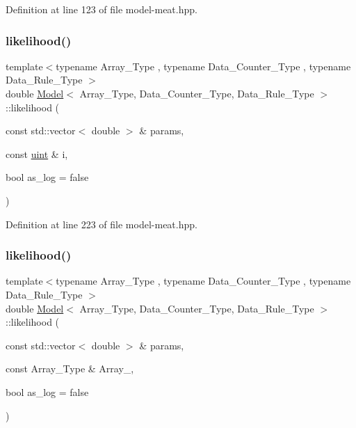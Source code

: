 Definition at line 123 of file model-\/meat.\+hpp.

\mbox{\label{class_model_ae75fe2213980b6b245e279c7836ab99b}} 
\subsubsection{\texorpdfstring{likelihood()}{likelihood()}\hspace{0.1cm}{\footnotesize\ttfamily [1/2]}}
{\footnotesize\ttfamily template$<$typename Array\+\_\+\+Type , typename Data\+\_\+\+Counter\+\_\+\+Type , typename Data\+\_\+\+Rule\+\_\+\+Type $>$ \\
double \hyperlink{class_model}{Model}$<$ Array\+\_\+\+Type, Data\+\_\+\+Counter\+\_\+\+Type, Data\+\_\+\+Rule\+\_\+\+Type $>$\+::likelihood (\begin{DoxyParamCaption}\item[{const std\+::vector$<$ double $>$ \&}]{params,  }\item[{const \hyperlink{typedefs_8hpp_a91ad9478d81a7aaf2593e8d9c3d06a14}{uint} \&}]{i,  }\item[{bool}]{as\+\_\+log = {\ttfamily false} }\end{DoxyParamCaption})\hspace{0.3cm}{\ttfamily [inline]}}



Definition at line 223 of file model-\/meat.\+hpp.

\mbox{\label{class_model_a1a11a54860e22fbd152de4d7cfd30b89}} 
\subsubsection{\texorpdfstring{likelihood()}{likelihood()}\hspace{0.1cm}{\footnotesize\ttfamily [2/2]}}
{\footnotesize\ttfamily template$<$typename Array\+\_\+\+Type , typename Data\+\_\+\+Counter\+\_\+\+Type , typename Data\+\_\+\+Rule\+\_\+\+Type $>$ \\
double \hyperlink{class_model}{Model}$<$ Array\+\_\+\+Type, Data\+\_\+\+Counter\+\_\+\+Type, Data\+\_\+\+Rule\+\_\+\+Type $>$\+::likelihood (\begin{DoxyParamCaption}\item[{const std\+::vector$<$ double $>$ \&}]{params,  }\item[{const Array\+\_\+\+Type \&}]{Array\+\_\+,  }\item[{bool}]{as\+\_\+log = {\ttfamily false} }\end{DoxyParamCaption})\hspace{0.3cm}{\ttfamily [inline]}}



